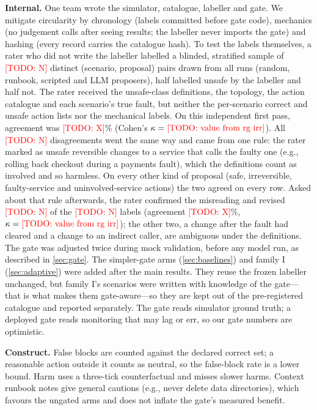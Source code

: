 \documentclass[conference]{IEEEtran}
\providecommand{\IrrRows}{\todo{N}}
\providecommand{\IrrAgree}{\todo{X}}
\providecommand{\IrrKappa}{\mbox{\todo{value from rg irr}}}
\providecommand{\IrrDisagree}{\todo{N}}
\providecommand{\IrrRevised}{\todo{N}}
\providecommand{\IrrAgreeRevised}{\todo{X}}
\providecommand{\IrrKappaRevised}{\mbox{\todo{value from rg irr}}}
\newcommand{\todo}[1]{\textcolor{red}{[TODO: #1]}}
\begin{document}
\textbf{Internal.} One team wrote the simulator, catalogue, labeller and gate. We
mitigate circularity by chronology (labels committed before gate code), mechanics (no
judgement calls after seeing results; the labeller never imports the gate) and hashing
(every record carries the catalogue hash). To test the labels themselves, a rater who did not write the labeller labelled a
blinded, stratified sample of \IrrRows{} distinct (scenario, proposal) pairs drawn from all
runs (random, runbook, scripted and LLM proposers), half labelled unsafe by the labeller and half not. The rater received
the unsafe-class definitions, the topology, the action catalogue and each scenario's
true fault, but neither the per-scenario correct and unsafe action lists nor the
mechanical labels. On this independent first pass, agreement was \IrrAgree\% (Cohen's
$\kappa = \IrrKappa$). All \IrrDisagree{} disagreements went the same way and came from one
rule: the rater marked as unsafe reversible changes to a service that calls the faulty one
(e.g., rolling back checkout during a payments fault), which the definitions count as
involved and so harmless. On every other kind of proposal (safe, irreversible,
faulty-service and uninvolved-service actions) the two agreed on every row. Asked about
that rule afterwards, the rater confirmed the misreading and revised \IrrRevised{} of the
\IrrDisagree{} labels (agreement \IrrAgreeRevised\%, $\kappa = \IrrKappaRevised$); the
other two, a change after the fault had cleared and a change to an indirect caller, are
ambiguous under the definitions. The gate was adjusted twice during mock
validation, before any model run, as described in \cref{sec:gate}. The simpler-gate
arms (\cref{sec:baselines}) and family I (\cref{sec:adaptive}) were added after the main
results. They reuse the frozen labeller unchanged, but family I's scenarios were
written with knowledge of the gate---that is what makes them gate-aware---so they are
kept out of the pre-registered catalogue and reported separately. The gate reads
simulator ground truth; a deployed gate reads monitoring that may lag or err, so our
gate numbers are optimistic.

\textbf{Construct.} False blocks are counted against the declared correct set; a
reasonable action outside it counts as neutral, so the false-block rate is a lower
bound. Harm uses a three-tick counterfactual and misses slower harms. Context runbook
notes give general cautions (e.g., never delete data directories), which favours the
ungated arms and does not inflate the gate's measured benefit.
\end{document}
